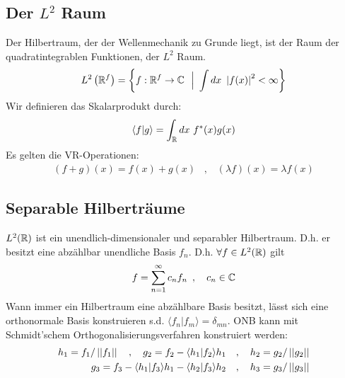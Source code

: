 \subsection{Der $L^2$ Raum}

Der Hilbertraum, der der Wellenmechanik zu Grunde liegt, ist der Raum der
quadratintegrablen Funktionen, der $L^2$ Raum.
\begin{align*}
    L^2 \klammer{\R^f} = \geschwungeneklammer{f: \R^f \rightarrow \C \ \ \Big| \ \int dx \ \abs{f(x)}^2 < \infty}
\end{align*}
Wir definieren das Skalarprodukt durch:
\begin{align*}
    \langle f | g \rangle = \int_{\mathbb{R}} dx \ f^\ast (x) g(x)
\end{align*}
Es gelten die VR-Operationen:
\begin{align*}
    (f+g)(x) = f(x) + g(x)
    \hspace{10pt} , \hspace{10pt}
    (\lambda f)(x) = \lambda f(x)
\end{align*}

\subsection{Separable Hilberträume}

$L^2 (\mathbb{R})$ ist ein unendlich-dimensionaler und separabler Hilbertraum. D.h.
er besitzt eine abzählbar unendliche Basis $f_n$. D.h. $\forall f \in L^2(\mathbb{R})$
gilt
\begin{align*}
    f = \sum_{n=1}^\infty c_n f_n \hspace{5pt} , \hspace{10pt} c_n \in \mathbb{C}
\end{align*}
Wann immer ein Hilbertraum eine abzählbare Basis besitzt, lässt sich eine orthonormale
Basis konstruieren s.d. $\langle f_n | f_m \rangle = \delta_{mn}$.
ONB kann mit Schmidt'schem Orthogonalisierungsverfahren konstruiert werden:
\begin{align*}
    h_1 = f_1 / \left\vert\left\vert f_1 \right\vert\right\vert
    \hspace{10pt} , \hspace{10pt}
    g_2 = f_2 - \langle h_1 | f_2 \rangle h_1
    \hspace{10pt} , \hspace{10pt}
    h_2 = g_2 / \left\vert\left\vert g_2 \right\vert\right\vert
    \\
    g_3 = f_3 - \langle h_1 | f_3 \rangle h_1 - \langle h_2 | f_3 \rangle h_2
    \hspace{10pt} , \hspace{10pt}
    h_3 = g_3 / \left\vert\left\vert g_3 \right\vert\right\vert
\end{align*}


